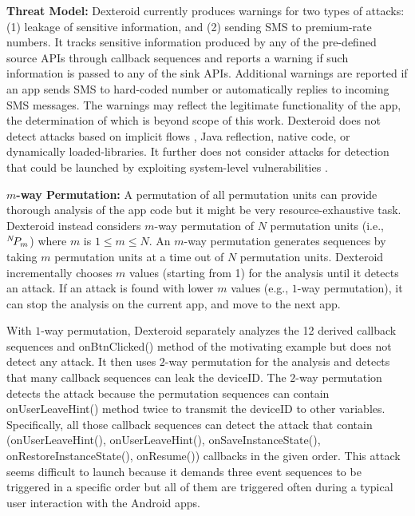 \documentclass[10pt]{elsarticle}
\begin{document}
{\noindent \bf Threat Model:} Dexteroid currently produces warnings for two types of attacks: (1) leakage of sensitive information, and (2) sending SMS to premium-rate numbers. It tracks sensitive information produced by any of the pre-defined source APIs through callback sequences and reports a warning if such information is passed to any of the sink APIs. Additional warnings are reported if an app sends SMS to hard-coded number or automatically replies to incoming SMS messages. The warnings may reflect the legitimate functionality of the app, the determination of which is beyond scope of this work. Dexteroid does not detect attacks based on implicit flows \cite{implicitFlows}, Java reflection, native code, or dynamically loaded-libraries. It further does not consider attacks for detection that could be launched by exploiting system-level vulnerabilities \cite{dissectingAndroid, perils}.  

{\noindent \bf $m$-way Permutation:} A permutation of all permutation units can provide thorough analysis of the app code but it might be very resource-exhaustive task. Dexteroid instead considers $m$-way permutation of $N$ permutation units (i.e., ${{}^{N}\mkern-3muP_{m}}$) where $m$ is $1\leq m\leq N$. An $m$-way permutation generates sequences by taking $m$ permutation units at a time out of $N$ permutation units. Dexteroid incrementally chooses $m$ values (starting from 1) for the analysis until it detects an attack. If an attack is found with lower $m$ values (e.g., $1$-way permutation), it can stop the analysis on the current app, and move to the next app. 

With $1$-way permutation, Dexteroid separately analyzes the 12 derived callback sequences and {\ttfamily onBtnClicked()} method of the motivating example but does not detect any attack. It then uses $2$-way permutation for the analysis and detects that many callback sequences can leak the deviceID. The $2$-way permutation detects the attack because the permutation sequences can contain {\ttfamily onUserLeaveHint()} method twice to transmit the deviceID to other variables. Specifically, all those callback sequences can detect the attack that contain ({\ttfamily onUserLeaveHint()}, {\ttfamily onUserLeaveHint()}, {\ttfamily onSaveInstanceState()}, {\ttfamily onRestoreInstanceState()}, {\ttfamily onResume()}) callbacks in the given order. This attack seems difficult to launch because it demands three event sequences to be triggered in a specific order but all of them are triggered often during a typical user interaction with the Android apps. 
\end{document}
